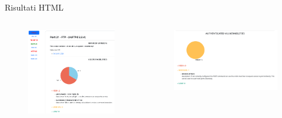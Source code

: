 \begin{frame}{Risultati HTML}
\begin{columns}
\begin{column}{0.5\textwidth}
    \begin{figure}
    \centering
    \includegraphics[width=6cm]{assets/mio/html_res1.png}
    \end{figure}
\end{column} 
\begin{column}{0.5\textwidth}
    \begin{figure}
    \centering
    \includegraphics[width=7cm]{assets/mio/html_results2.png}
    \end{figure}
\end{column} 
\end{columns}
\end{frame}